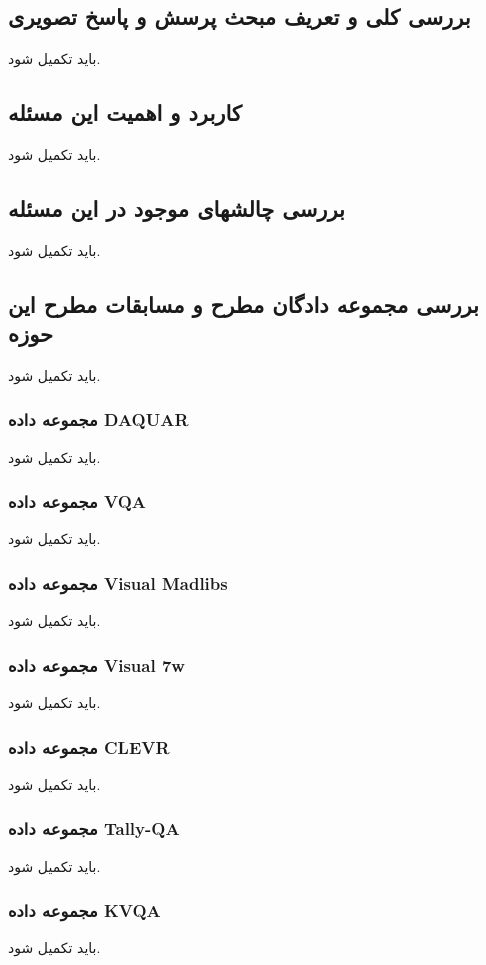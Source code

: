 

\chapter{}
\section{بررسی کلی و تعریف مبحث پرسش و پاسخ تصویری}
باید تکمیل شود.
\section{کاربرد و اهمیت این مسئله}
باید تکمیل شود.
\section{بررسی چالشهای موجود در این مسئله}
باید تکمیل شود.
\section{بررسی مجموعه دادگان مطرح و مسابقات مطرح این حوزه}
باید تکمیل شود.
\subsection{مجموعه داده DAQUAR}
باید تکمیل شود.
\subsection{مجموعه داده VQA}
باید تکمیل شود.
\subsection{مجموعه داده Visual Madlibs}
باید تکمیل شود.
\subsection{مجموعه داده Visual 7w}
باید تکمیل شود.
\subsection{مجموعه داده CLEVR}
باید تکمیل شود.
\subsection{مجموعه داده Tally-QA}
باید تکمیل شود.
\subsection{مجموعه داده KVQA}
باید تکمیل شود.
